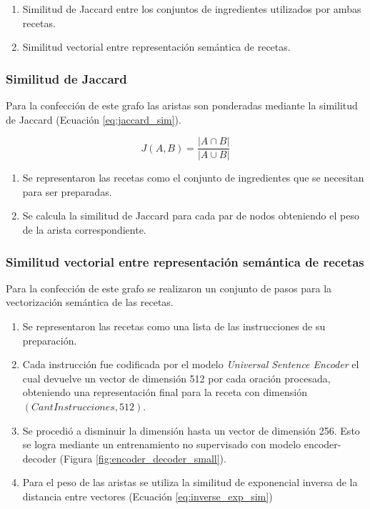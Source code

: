 \documentclass[
	a4paper, %
	10pt, %
	unnumberedsections, %
	twoside, %
]{LTJournalArticle}
\begin{document}
\begin{enumerate}
	\item Similitud de Jaccard entre los conjuntos de ingredientes utilizados por ambas recetas.
	\item Similitud vectorial entre representación semántica de recetas.
\end{enumerate}

\subsubsection{Similitud de Jaccard}

Para la confección de este grafo las aristas son ponderadas mediante la similitud de Jaccard (Ecuación \ref{eq:jaccard_sim}).

\begin{equation}
	J(A, B) = \frac{|A \cap B|}{|A \cup B|}
	\label{eq:jaccard_sim}
\end{equation}

\begin{enumerate}
	\item Se representaron las recetas como el conjunto de ingredientes que se necesitan para ser preparadas.
	\item Se calcula la similitud de Jaccard para cada par de nodos obteniendo el peso de la arista correspondiente.
\end{enumerate}

\subsubsection{Similitud vectorial entre representación semántica de recetas}

Para la confección de este grafo se realizaron un conjunto de pasos para la vectorización semántica de las recetas.

\begin{enumerate}
	\item Se representaron las recetas como una lista de las instrucciones de su preparación.
	\item Cada instrucción fue codificada por el modelo \textit{Universal Sentence Encoder} \autocite{Smith:2023qr}
	el cual devuelve un vector de dimensión 512 por cada oración procesada, obteniendo una representación final
	para la receta con dimensión $(CantInstrucciones, 512)$. 
	\item Se procedió a disminuir la dimensión hasta un vector de dimensión 256. Esto se logra mediante un 
	entrenamiento no supervisado con modelo encoder-decoder (Figura \ref{fig:encoder_decoder_small}).
	\item Para el peso de las aristas se utiliza la similitud de exponencial inversa de la distancia entre vectores 
	(Ecuación \ref{eq:inverse_exp_sim})
\end{enumerate}
\end{document}
